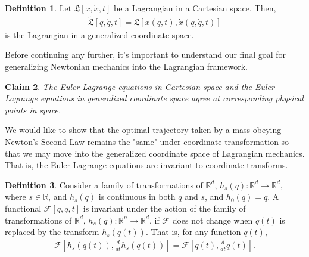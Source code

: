\documentclass[10pt, psamsfonts]{amsart}
\newtheorem{thm}{Theorem}[section]
\newtheorem{claim}[thm]{Claim}
\theoremstyle{definition}
\newtheorem{defn}[thm]{Definition}
\theoremstyle{remark}
\numberwithin{equation}{section}
\begin{document}
\begin{defn}
Let $\mathfrak{L}[x, \dot{x}, t]$ be a Lagrangian in a Cartesian space. Then, 
\begin{align*}
  \tilde{\mathfrak{L}}[q, \dot{q}, t] = \mathfrak{L}[x(q,t), \dot{x}(q, \dot{q}, t)] 
\end{align*}
is the Lagrangian in a generalized coordinate space. 
\end{defn}

Before continuing any further, it's important to understand our final goal for generalizing Newtonian mechanics into the Lagrangian framework.
\begin{claim}
  The Euler-Lagrange equations in Cartesian space and the Euler-Lagrange equations in generalized coordinate space agree at corresponding physical points in space.
\end{claim}
We would like to show that the optimal trajectory taken by a mass obeying Newton's Second Law remains the "same" under coordinate transformation so that we may move into the generalized coordinate space of Lagrangian mechanics. That is, the Euler-Lagrange equations are invariant to coordinate transforms.

\begin{defn}
Consider a family of transformations of $\mathbb{R}^d$, $h_s(q):\mathbb{R}^d \to \mathbb{R}^d $, where $s \in \mathbb{R}$, and $h_s(q)$ is continuous in both $q$ and $s$, and $h_0(q) = q$. A functional $\mathcal{F}[q, \dot{q}, t]$ is invariant under the action of the family of transformations of $\mathbb{R}^d$, $h_s(q): \mathbb{R}^n \to \mathbb{R}^d$, if $\mathcal{F}$ does not change when $q(t)$ is replaced by the transform $h_s(q(t))$. That is, for any function $q(t)$,
\begin{align*}
  \mathcal{F}[h_s(q(t)), \frac{d}{dt} h_s(q(t))] = \mathcal{F}[q(t), \frac{d}{dt} q(t)].
\end{align*}
\cite[Chertkov, Clark]{7}
\end{defn}

\end{document}

